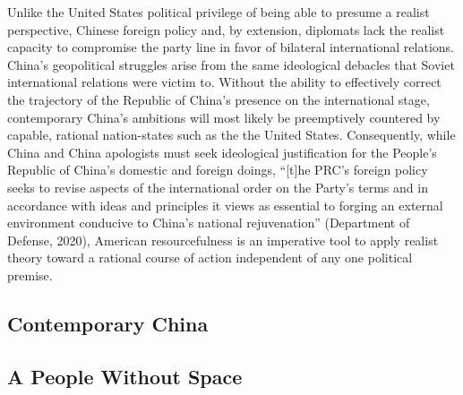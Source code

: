 \documentclass[12pt]{article}
\begin{document}
Unlike the United States political privilege of being able to presume a realist perspective, Chinese foreign policy and, by extension, diplomats lack the realist capacity to compromise the party line in favor of bilateral international relations. China's geopolitical struggles arise from the same ideological debacles that Soviet international relations were victim to. Without the ability to effectively correct the trajectory of the Republic of China's presence on the international stage, contemporary China's ambitions will most likely be preemptively countered by capable, rational nation-states such as the the United States. Consequently, while China and China apologists must seek ideological justification for the People's Republic of China's domestic and foreign doings, “[t]he PRC's foreign policy seeks to revise aspects of the international order on the Party's terms and in accordance with ideas and principles it views as essential to forging an external environment conducive to China's national rejuvenation” (Department of Defense, 2020), American resourcefulness is an imperative tool to apply realist theory toward a rational course of action independent of any one political premise.
\begin{center}
  \section{\normalsize Contemporary China}
\end{center}
\begin{center}
  \subsection{\normalsize A People Without Space}
\end{center}
\end{document}
